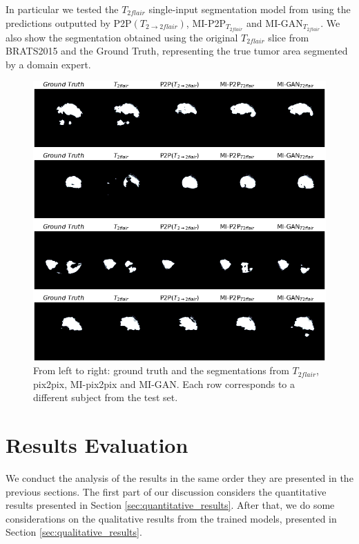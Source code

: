 In particular we tested the $T_{2flair}$  single-input segmentation model from \cite{giacomello2019brain} using the predictions outputted by P2P$(T_{2 \rightarrow 2flair})$, MI-P2P{$_{T_{2flair}}$} and MI-GAN$_{T_{2flair}}$.
We also show the segmentation obtained using the original $T_{2flair}$ slice from BRATS2015 and the Ground Truth, representing the true tumor area segmented by a domain expert.

\begin{figure}[H]
\centering
\includegraphics[width=0.636\textheight]{images/segmentation_results1.pdf}
\caption[Segmentations using GAN predictions]{From left to right: ground truth and the segmentations from $T_{2flair}$, pix2pix, MI-pix2pix and MI-GAN. Each row corresponds to a different subject from the test set.}
\label{fig:segmentation_qualitative_results}
\end{figure}

\section{Results Evaluation}
\label{sec:results_evaluation}
We conduct the analysis of the results in the same order they are presented in the previous sections. The first part of our discussion considers the quantitative results presented in Section \ref{sec:quantitative_results}. After that, we do some considerations on the qualitative results from the trained models, presented in Section \ref{sec:qualitative_results}. 

